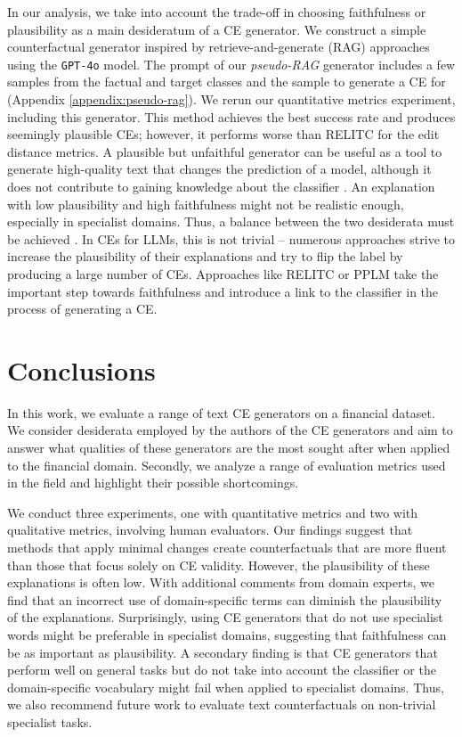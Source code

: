 \documentclass[11pt]{article}
\begin{document}
In our analysis, we take into account the trade-off in choosing faithfulness or plausibility as a main desideratum of a CE generator. We construct a simple counterfactual generator inspired by retrieve-and-generate (RAG) approaches \cite{dixit_core_2022} using the \texttt{GPT-4o} model. The prompt of our \textit{pseudo-RAG} generator includes a few samples from the factual and target classes and the sample to generate a CE for (Appendix \ref{appendix:pseudo-rag}). We rerun our quantitative metrics experiment, including this generator. This method achieves the best success rate and produces seemingly plausible CEs; however, it performs worse than RELITC for the edit distance metrics. A plausible but unfaithful generator can be useful as a tool to generate high-quality text that changes the prediction of a model, although it does not contribute to gaining knowledge about the classifier \cite{agarwal_faithfulness_2024, altmeyer_faithful_2024}. An explanation with low plausibility and high faithfulness might not be realistic enough, especially in specialist domains. Thus, a balance between the two desiderata must be achieved \cite{lu_does_2024}. In CEs for LLMs, this is not trivial -- numerous approaches strive to increase the plausibility of their explanations and try to flip the label by producing a large number of CEs. Approaches like RELITC or PPLM take the important step towards faithfulness and introduce a link to the classifier in the process of generating a CE. 

\section{Conclusions}

In this work, we evaluate a range of text CE generators on a financial dataset. We consider desiderata employed by the authors of the CE generators and aim to answer what qualities of these generators are the most sought after when applied to the financial domain. Secondly, we analyze a range of evaluation metrics used in the field and highlight their possible shortcomings.

We conduct three experiments, one with quantitative metrics and two with qualitative metrics, involving human evaluators. Our findings suggest that methods that apply minimal changes create counterfactuals that are more fluent than those that focus solely on CE validity. However, the plausibility of these explanations is often low. With additional comments from domain experts, we find that an incorrect use of domain-specific terms can diminish the plausibility of the explanations. Surprisingly, using CE generators that do not use specialist words might be preferable in specialist domains, suggesting that faithfulness can be as important as plausibility. A secondary finding is that CE generators that perform well on general tasks but do not take into account the classifier or the domain-specific vocabulary might fail when applied to specialist domains. Thus, we also recommend future work to evaluate text counterfactuals on non-trivial specialist tasks.
\end{document}
